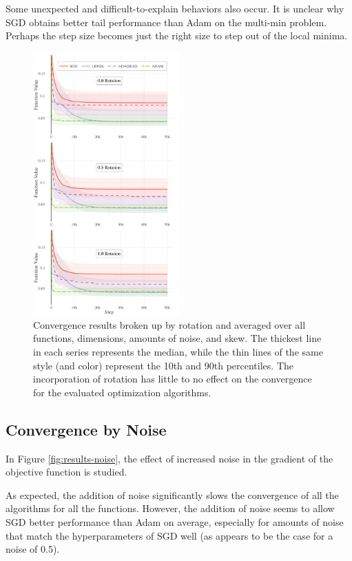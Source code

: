 \documentclass[letterpaper, 10 pt, conference]{IEEEtran}  %
\begin{document}
Some unexpected and difficult-to-explain behaviors also occur.  It is
unclear why SGD obtains better tail performance than Adam on the
multi-min problem. Perhaps the step size becomes just the right
size to step out of the local minima.

\begin{figure}
  \centering
  \includegraphics[width=0.5\textwidth]{Figures/final-rotation}
  \caption{Convergence results broken up by rotation and averaged over
    all functions, dimensions, amounts of noise, and skew. The
    thickest line in each series represents the median, while the thin
    lines of the same style (and color) represent the 10th and 90th
    percentiles. The incorporation of rotation has little to no effect
    on the convergence for the evaluated optimization algorithms.}
  \label{fig:results-rotation}
\end{figure}


\subsection{Convergence by Noise}

In Figure \ref{fig:results-noise}, the effect of increased noise in
the gradient of the objective function is studied.

As expected, the addition of noise significantly slows the convergence
of all the algorithms for all the functions.  However, the addition of
noise seems to allow SGD better performance than Adam on average,
especially for amounts of noise that match the hyperparameters of SGD
well (as appears to be the case for a noise of 0.5).
\end{document}
